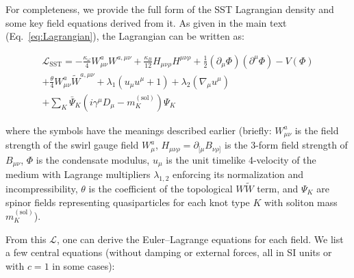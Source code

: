 \documentclass[10pt,reprint,aps,onecolumn,nofootinbib]{revtex4-2}
\begin{document}

For completeness, we provide the full form of the SST Lagrangian density and some key field equations derived from it. As given in the main text (Eq.~\ref{eq:Lagrangian}), the Lagrangian can be written as:

\begin{align}
\mathcal{L}_\text{SST} =
    -\frac{\kappa_\omega}{4} W^{a}_{\mu\nu} W^{a,\mu\nu}
    + \frac{\kappa_B}{12} H_{\mu\nu\rho} H^{\mu\nu\rho}
    + \frac{1}{2} (\partial_\mu \Phi)(\partial^\mu \Phi)
    - V(\Phi) \nonumber \\
    + \frac{\theta}{4} W^{a}_{\mu\nu} \tilde{W}^{a,\mu\nu}
    + \lambda_1 (u_\mu u^\mu + 1)
    + \lambda_2 (\nabla_\mu u^\mu) \nonumber \\
    + \sum_K \bar{\Psi}_K \left( i\gamma^\mu D_\mu - m^{(\text{sol})}_K \right) \Psi_K
\label{eq:Lagrangian_full}
\end{align}

where the symbols have the meanings described earlier (briefly: $W^a_{\mu\nu}$ is the field strength of the swirl gauge field $W^a_\mu$, $H_{\mu\nu\rho} = \partial_{[\mu} B_{\nu\rho]}$ is the 3-form field strength of $B_{\mu\nu}$, $\Phi$ is the condensate modulus, $u_\mu$ is the unit timelike 4-velocity of the medium with Lagrange multipliers $\lambda_{1,2}$ enforcing its normalization and incompressibility, $\theta$ is the coefficient of the topological $W\tilde{W}$ term, and $\Psi_K$ are spinor fields representing quasiparticles for each knot type $K$ with soliton mass $m^{(\text{sol})}_K$).


From this $\mathcal{L}$, one can derive the Euler–Lagrange equations for each field. We list a few central equations (without damping or external forces, all in SI units or with $c=1$ in some cases):
\end{document}
